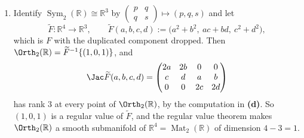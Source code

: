 \begin{exercisesolution}
\begin{enumerate}[label=\textbf{(\alph*)}]
    This is why \cref{thm:regular_value_theorem} cannot be applied to $F$ as a map
    $\mathbb{R}^4 \to \mathbb{R}^4$: the theorem needs $D_AF$ to be \emph{surjective}, that is of
    rank $4$, and the rank is $3$ at every point of $\Orth_2(\mathbb{R})$. Nor is this a defect of
    the particular level: by \textbf{(b)} the image of $F$ lies in a three-dimensional subspace, so
    $D_AF$ is nowhere surjective, for any $A$ whatsoever.

  \item Identify $\operatorname{Sym}_2(\mathbb{R}) \cong \mathbb{R}^3$ by
    $\left(\begin{smallmatrix} p & q \\ q & s\end{smallmatrix}\right) \mapsto (p,q,s)$ and let
\[\widetilde F : \mathbb{R}^4 \to \mathbb{R}^3, \qquad
  \widetilde F(a,b,c,d) := \big(a^2+b^2,\ ac+bd,\ c^2+d^2\big),\]
    which is $F$ with the duplicated component dropped. Then
    $\Orth_2(\mathbb{R}) = \widetilde F^{-1}\{(1,0,1)\}$, and
\[\Jac \widetilde F(a,b,c,d) = \begin{pmatrix}
  2a & 2b & 0 & 0 \\
  c & d & a & b \\
  0 & 0 & 2c & 2d
\end{pmatrix}\]
    has rank $3$ at every point of $\Orth_2(\mathbb{R})$, by the computation in \textbf{(d)}. So
    $(1,0,1)$ is a regular value of $\widetilde F$, and the regular value theorem makes
    $\Orth_2(\mathbb{R})$ a smooth submanifold of $\mathbb{R}^4 = \operatorname{Mat}_2(\mathbb{R})$
    of dimension $4 - 3 = 1$.


\end{enumerate}
\end{exercisesolution}
